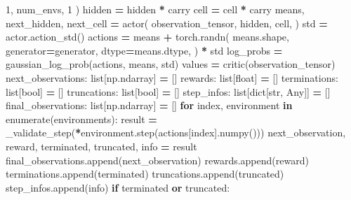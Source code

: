 \documentclass[
  american,
  11pt,
  letterpaper,
]{article}
\newenvironment{Shaded}{\begin{snugshade}}{\end{snugshade}}
\newcommand{\BuiltInTok}[1]{#1}
\newcommand{\ControlFlowTok}[1]{\textcolor[rgb]{0.13,0.29,0.53}{\textbf{#1}}}
\newcommand{\DecValTok}[1]{\textcolor[rgb]{0.00,0.00,0.81}{#1}}
\newcommand{\KeywordTok}[1]{\textcolor[rgb]{0.13,0.29,0.53}{\textbf{#1}}}
\newcommand{\NormalTok}[1]{#1}
\newcommand{\OperatorTok}[1]{\textcolor[rgb]{0.81,0.36,0.00}{\textbf{#1}}}
\renewenvironment{Shaded}{\par\smallskip}{\par\smallskip}
\begin{document}
\begin{Shaded}
\begin{Highlighting}[]
                \DecValTok{1}\NormalTok{, num\_envs, }\DecValTok{1}
\NormalTok{            )}
\NormalTok{            hidden }\OperatorTok{=}\NormalTok{ hidden }\OperatorTok{*}\NormalTok{ carry}
\NormalTok{            cell }\OperatorTok{=}\NormalTok{ cell }\OperatorTok{*}\NormalTok{ carry}
\NormalTok{            means, next\_hidden, next\_cell }\OperatorTok{=}\NormalTok{ actor(}
\NormalTok{                observation\_tensor,}
\NormalTok{                hidden,}
\NormalTok{                cell,}
\NormalTok{            )}
\NormalTok{            std }\OperatorTok{=}\NormalTok{ actor.action\_std()}
\NormalTok{            actions }\OperatorTok{=}\NormalTok{ means }\OperatorTok{+}\NormalTok{ torch.randn(}
\NormalTok{                means.shape,}
\NormalTok{                generator}\OperatorTok{=}\NormalTok{generator,}
\NormalTok{                dtype}\OperatorTok{=}\NormalTok{means.dtype,}
\NormalTok{            ) }\OperatorTok{*}\NormalTok{ std}
\NormalTok{            log\_probs }\OperatorTok{=}\NormalTok{ gaussian\_log\_prob(actions, means, std)}
\NormalTok{            values }\OperatorTok{=}\NormalTok{ critic(observation\_tensor)}
\NormalTok{        next\_observations: }\BuiltInTok{list}\NormalTok{[np.ndarray] }\OperatorTok{=}\NormalTok{ []}
\NormalTok{        rewards: }\BuiltInTok{list}\NormalTok{[}\BuiltInTok{float}\NormalTok{] }\OperatorTok{=}\NormalTok{ []}
\NormalTok{        terminations: }\BuiltInTok{list}\NormalTok{[}\BuiltInTok{bool}\NormalTok{] }\OperatorTok{=}\NormalTok{ []}
\NormalTok{        truncations: }\BuiltInTok{list}\NormalTok{[}\BuiltInTok{bool}\NormalTok{] }\OperatorTok{=}\NormalTok{ []}
\NormalTok{        step\_infos: }\BuiltInTok{list}\NormalTok{[}\BuiltInTok{dict}\NormalTok{[}\BuiltInTok{str}\NormalTok{, Any]] }\OperatorTok{=}\NormalTok{ []}
\NormalTok{        final\_observations: }\BuiltInTok{list}\NormalTok{[np.ndarray] }\OperatorTok{=}\NormalTok{ []}
        \ControlFlowTok{for}\NormalTok{ index, environment }\KeywordTok{in} \BuiltInTok{enumerate}\NormalTok{(environments):}
\NormalTok{            result }\OperatorTok{=}\NormalTok{ \_validate\_step(}\OperatorTok{*}\NormalTok{environment.step(actions[index].numpy()))}
\NormalTok{            next\_observation, reward, terminated, truncated, info }\OperatorTok{=}\NormalTok{ result}
\NormalTok{            final\_observations.append(next\_observation)}
\NormalTok{            rewards.append(reward)}
\NormalTok{            terminations.append(terminated)}
\NormalTok{            truncations.append(truncated)}
\NormalTok{            step\_infos.append(info)}
            \ControlFlowTok{if}\NormalTok{ terminated }\KeywordTok{or}\NormalTok{ truncated:}

\end{Highlighting}
\end{Shaded}
\end{document}
